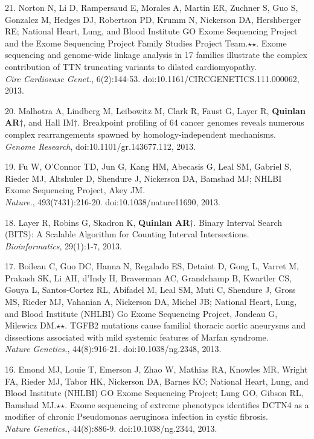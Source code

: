 \documentclass[margin,line]{cv}
\begin{document}
\begin{resume}
\begin{list}{*}{}
    \item[21.] Norton N, Li D, Rampersaud E, Morales A, Martin ER, Zuchner S, Guo S, Gonzalez M, Hedges DJ, Robertson PD, Krumm N, Nickerson DA, Hershberger RE; National Heart, Lung, and Blood Institute GO Exome Sequencing Project and the Exome Sequencing Project Family Studies Project Team.$\star$$\star$. Exome sequencing and genome-wide linkage analysis in 17 families illustrate the complex contribution of TTN truncating variants to dilated cardiomyopathy.\\
    \emph{Circ Cardiovasc Genet.}, 6(2):144-53. doi:10.1161/CIRCGENETICS.111.000062, 2013.

    \item[20.] Malhotra A, Lindberg M, Leibowitz M, Clark R, Faust G, Layer R, \textbf{Quinlan AR}$\dagger$, and Hall IM$\dagger$.
    Breakpoint profiling of 64 cancer genomes reveals numerous complex rearrangements spawned by homology-independent mechanisms. \\
    \emph{Genome Research}, doi:10.1101/gr.143677.112, 2013.

    \item[19.] Fu W, O'Connor TD, Jun G, Kang HM, Abecasis G, Leal SM, Gabriel S, Rieder MJ, Altshuler D, Shendure J, Nickerson DA, Bamshad MJ; NHLBI Exome Sequencing Project, Akey JM.\\
    \emph{Nature.}, 493(7431):216-20. doi:10.1038/nature11690, 2013.

    \item[18.] Layer R, Robins G, Skadron K, \textbf{Quinlan AR}$\dagger$.
    Binary Interval Search (BITS): A Scalable Algorithm for Counting Interval Intersections.\\
    \emph{Bioinformatics}, 29(1):1-7, 2013.

    \item[17.] Boileau C, Guo DC, Hanna N, Regalado ES, Detaint D, Gong L, Varret M, Prakash SK, Li AH, d'Indy H, Braverman AC, Grandchamp B, Kwartler CS, Gouya L, Santos-Cortez RL, Abifadel M, Leal SM, Muti C, Shendure J, Gross MS, Rieder MJ, Vahanian A, Nickerson DA, Michel JB; National Heart, Lung, and Blood Institute (NHLBI) Go Exome Sequencing Project, Jondeau G, Milewicz DM.$\star$$\star$. TGFB2 mutations cause familial thoracic aortic aneurysms and dissections associated with mild systemic features of Marfan syndrome.\\
    \emph{Nature Genetics.}, 44(8):916-21. doi:10.1038/ng.2348, 2013.

    \item[16.] Emond MJ, Louie T, Emerson J, Zhao W, Mathias RA, Knowles MR, Wright FA, Rieder MJ, Tabor HK, Nickerson DA, Barnes KC; National Heart, Lung, and Blood Institute (NHLBI) GO Exome Sequencing Project; Lung GO, Gibson RL, Bamshad MJ.$\star$$\star$. Exome sequencing of extreme phenotypes identifies DCTN4 as a modifier of chronic Pseudomonas aeruginosa infection in cystic fibrosis.\\
    \emph{Nature Genetics.}, 44(8):886-9. doi:10.1038/ng.2344, 2013.


\end{list}
\end{resume}
\end{document}
